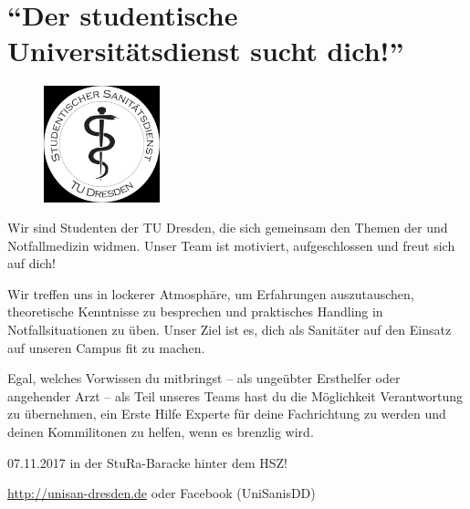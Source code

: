 \section*{\enquote{Der studentische Universitätsdienst sucht dich!}}

\begin{figure}%
  \includegraphics[width=0.3\textwidth]{./unisan-logo-gray.jpg}
\end{figure}
   Wir sind Studenten der TU Dresden, die sich gemeinsam den
    Themen der  und Notfallmedizin widmen. Unser Team ist
motiviert, aufgeschlossen und freut sich auf dich!

 Wir treffen uns in lockerer Atmosphäre, um Erfahrungen
auszutauschen, theoretische Kenntnisse zu besprechen und praktisches
Handling in Notfallsituationen zu üben. Unser Ziel ist es, dich als
Sanitäter auf den Einsatz auf unseren Campus fit zu machen.

   Egal, welches Vorwissen du mitbringst -- als ungeübter
Ersthelfer oder angehender Arzt -- als Teil unseres Teams hast du die
Möglichkeit Verantwortung zu übernehmen, ein Erste Hilfe Experte für
deine Fachrichtung zu werden und deinen Kommilitonen zu helfen, wenn es
brenzlig wird.

 07.11.2017 in der StuRa-Baracke hinter dem HSZ!

 \url{http://unisan-dresden.de} oder Facebook (UniSanisDD)
